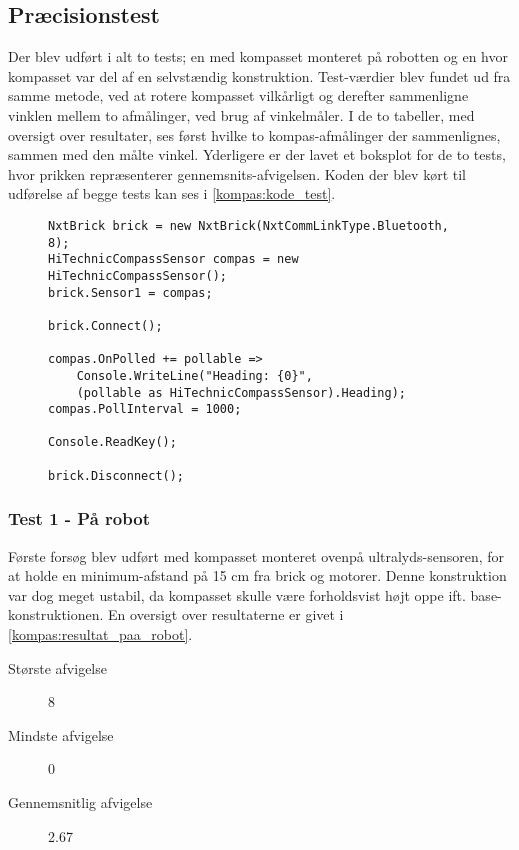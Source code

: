 \subsection{Præcisionstest}\label{kompas:precision}
Der blev udført i alt to tests; en med kompasset monteret på robotten og en hvor kompasset var del af en selvstændig konstruktion.
Test-værdier blev fundet ud fra samme metode, ved at rotere kompasset vilkårligt og derefter sammenligne vinklen mellem to afmålinger, ved brug af vinkelmåler.
I de to tabeller, med oversigt over resultater, ses først hvilke to kompas-afmålinger der sammenlignes, sammen med den målte vinkel.
Yderligere er der lavet et boksplot for de to tests, hvor prikken repræsenterer gennemsnits-afvigelsen.
Koden der blev kørt til udførelse af begge tests kan ses i \cref{kompas:kode_test}.

\begin{figure}[h]
\begin{lstlisting}[style=csharpsmall,caption={Kode brugt til test},label=kompas:kode_test,frame=single]
NxtBrick brick = new NxtBrick(NxtCommLinkType.Bluetooth, 8);
HiTechnicCompassSensor compas = new HiTechnicCompassSensor();
brick.Sensor1 = compas;

brick.Connect();

compas.OnPolled += pollable =>
	Console.WriteLine("Heading: {0}",
	(pollable as HiTechnicCompassSensor).Heading);
compas.PollInterval = 1000;

Console.ReadKey();

brick.Disconnect();
\end{lstlisting}
\end{figure}

\subsubsection{Test 1 - På robot}
Første forsøg blev udført med kompasset monteret ovenpå ultralyds-sensoren, for at holde en minimum-afstand på 15 cm fra brick og motorer.
Denne konstruktion var dog meget ustabil, da kompasset skulle være forholdsvist højt oppe ift. base-konstruktionen.
En oversigt over resultaterne er givet i \cref{kompas:resultat_paa_robot}.

\begin{description}
\item[Største afvigelse]{8\dg}
\item[Mindste afvigelse]{0\dg}
\item[Gennemsnitlig afvigelse]{2.67}
\end{description}

